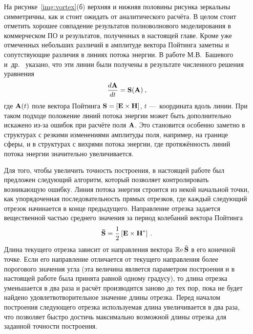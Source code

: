 На рисунке~\ref{img:vortex}(б) верхняя и нижняя половины рисунка
зеркальны симметричны, как и стоит ожидать от аналитического
расчёта. В целом стоит отметить хорошее совпадение результатов
полноволнового моделирования в коммерческом ПО
и результатов, полученных в настоящей главе.  Кроме уже отмеченных
небольших различий в амплитуде вектора Пойтинга заметны и
сопутствующие различия в линиях потока энергии. В работе
М.В.~Башевого и~др.~\cite{Bashevoy-2005} указано, что эти линии были
получены в результате численного решения уравнения
\begin{equation*}
  \frac{d\boldsymbol{\rm A}}{dt}=\boldsymbol{\rm S}(\boldsymbol{\rm A})\:,
\end{equation*}
где $\boldsymbol{\rm A}(t)$ поле вектора Пойтинга
$\boldsymbol{\rm S}=\left[\boldsymbol{\rm E}\times\boldsymbol{\rm H}\right]$, $t$
---~координата вдоль линии.  При таком подходе положение линий потока
энергии может быть дополнительно искажено из-за ошибок при расчёте
поля $\boldsymbol{\rm A}$. Это становится особенно заметно в структурах с
резкими изменениями амплитуды поля, например, на границе сферы, и в
структурах с вихрями потока энергии, где протяжённость линий потока
энергии значительно увеличивается.

Для того, чтобы увеличить точность построения, в настоящей работе был
предложен следующий алгоритм, который позволяет контролировать
возникающую ошибку. Линия потока энергия строится из некой начальной
точки, как упорядоченная последовательность прямых отрезков, где
каждый следующий отрезок начинается в конце предыдущего. Направление
отрезка задается вещественной частью среднего значения за период
колебаний вектора Пойтинга
\begin{equation*}
  \boldsymbol{\bar{\rm S}} = \frac{1}{2}
  \left[\boldsymbol{\rm E}\times\boldsymbol{\rm H}^*\right]\:.
\end{equation*}
Длина текущего отрезка зависит от направления вектора
$\operatorname{\mathbb{R}e}\boldsymbol{\bar{\rm S}}$ в его конечной
точке. Если его направление отличается от текущего направления более
порогового значения угла (эта величина является параметром построения
и в настоящей работе была принята равной одному градусу), то длина
отрезка уменьшается в два раза и расчёт производится заново до тех
пор, пока не будет найдено удовлетвотворительное значение длины
отрезка. Перед началом построения следующего отрезка используемая
длина увеличивается в два раза, что позволяет быстро достичь
максимально возможной длины отрезка для заданной точности
построения. 

